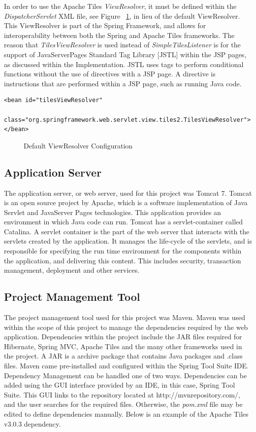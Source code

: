 In order to use the Apache Tiles \textit{ViewResolver}, it must be defined within the \textit{DispatcherServlet} XML file, see Figure ~\ref{fig:tilesViewRes}, in lieu of the default ViewResolver. This ViewResolver is part of the Spring Framework, and allows for interoperability between both the Spring and Apache Tiles frameworks. The reason that \textit{TilesViewResolver} is used instead of \textit{SimpleTilesListener} is for the support of JavaServerPages Standard Tag Library [JSTL] within the JSP pages, as discussed within the Implementation. JSTL uses tags to perform conditional functions without the use of directives with a JSP page. A directive is instructions that are performed within a JSP page, such as running Java code.

\begin{lstlisting}
<bean id="tilesViewResolver"
	class="org.springframework.web.servlet.view.tiles2.TilesViewResolver">
</bean>
\end{lstlisting}
\begin{figure}[H]
\caption{Default ViewResolver Configuration}
\label{fig:tilesViewRes}
\end{figure}

\subsection{Application Server}

The application server, or web server, used for this project was Tomcat 7.  Tomcat is an open source project by Apache, which is a software implementation of Java Servlet and JavaServer Pages technologies. This application provides an environment in which Java code can run. Tomcat has a servlet-container called Catalina. A servlet container is the part of the web server that interacts with the servlets created by the application. It manages the life-cycle of the servlets, and is responsible for specifying the run time environment for the components within the application, and delivering this content. This includes security, transaction management, deployment and other services. 

\subsection{Project Management Tool}

The project management tool used for this project was Maven. Maven was used within the scope of this project to manage the dependencies required by the web application. Dependencies within the project include the JAR files required for Hibernate, Spring MVC, Apache Tiles and the many other frameworks used in the project. A JAR is a archive package that contains Java packages and .class files. Maven came pre-installed and configured within the Spring Tool Suite IDE. Dependency Management can be handled one of two ways. Dependencies can be added using the GUI interface provided by an IDE, in this case, Spring Tool Suite. This GUI links to the repository located at http://mvnrepository.com/, and the user searches for the required files. Otherwise, the \textit{pom.xml} file may be edited to define dependencies manually. Below is an example of the Apache Tiles v3.0.3 dependency.


